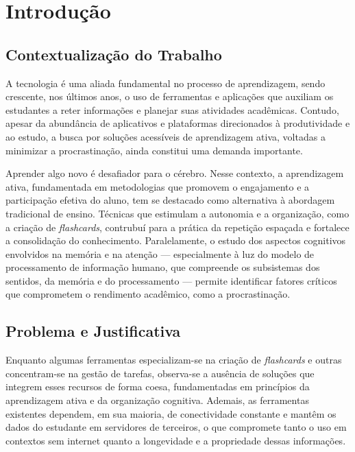 \documentclass[12pt, %
openright, 
oneside,
a4paper,
english,   %
brazil]{facom-ufu-abntex2}
\begin{document}

\tableofcontents*
\cleardoublepage





\textual



\chapter[Introdução]{Introdução}

\section{Contextualização do Trabalho}
A tecnologia é uma aliada fundamental no processo de aprendizagem, sendo crescente, nos últimos anos, o uso de ferramentas e aplicações que auxiliam os estudantes a reter informações e planejar suas atividades acadêmicas. Contudo, apesar da abundância de aplicativos e plataformas direcionados à produtividade e ao estudo, a busca por soluções acessíveis de aprendizagem ativa, voltadas a minimizar a procrastinação, ainda constitui uma demanda importante.

Aprender algo novo é desafiador para o cérebro. Nesse contexto, a aprendizagem ativa, fundamentada em metodologias que promovem o engajamento e a participação efetiva do aluno, tem se destacado como alternativa à abordagem tradicional de ensino. Técnicas que estimulam a autonomia e a organização, como a criação de \textit{flashcards}, contrubuí para a prática da repetição espaçada e fortalece a consolidação do conhecimento. Paralelamente, o estudo dos aspectos cognitivos envolvidos na memória e na atenção --- especialmente à luz do modelo de processamento de informação humano, que compreende os subsistemas dos sentidos, da memória e do processamento --- permite identificar fatores críticos que comprometem o rendimento acadêmico, como a procrastinação.

\section{Problema e Justificativa}
Enquanto algumas ferramentas especializam-se na criação de \textit{flashcards} e outras concentram-se na gestão de tarefas, observa-se a ausência de soluções que integrem esses recursos de forma coesa, fundamentadas em princípios da aprendizagem ativa e da organização cognitiva. Ademais, as ferramentas existentes dependem, em sua maioria, de conectividade constante e mantêm os dados do estudante em servidores de terceiros, o que compromete tanto o uso em contextos sem internet quanto a longevidade e a propriedade dessas informações.
\end{document}
